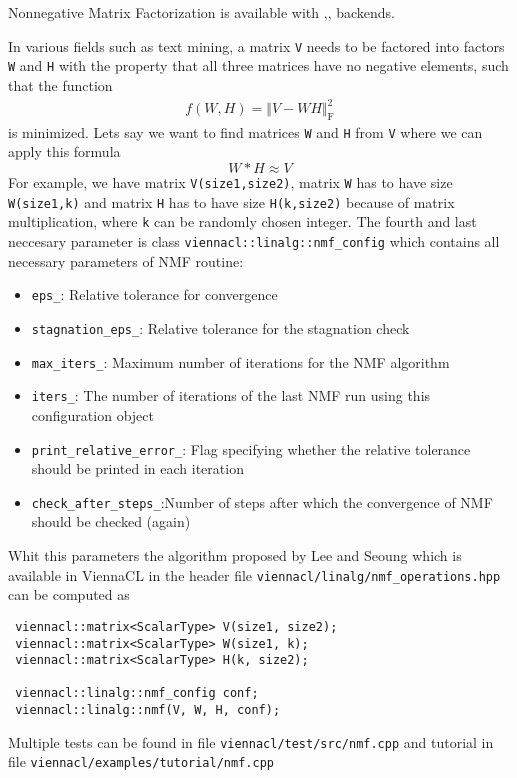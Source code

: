 Nonnegative Matrix Factorization is available with {\OpenCL},{\CUDA},{\OpenMP} backends.

In various fields such as text mining, a matrix \lstinline|V| needs to be factored into factors \lstinline|W| and \lstinline|H|  with the property that all three matrices have no negative elements, 
such that the function
\begin{align*}
 f(W, H) = \Vert V - WH \Vert_{\mathrm{F}}^2
\end{align*}
is minimized. Lets say we want to find matrices \lstinline|W| and \lstinline|H| from \lstinline|V| where we can apply this formula $$ W*H \approx V$$ For example, we have matrix 
\lstinline|V(size1,size2)|, matrix \lstinline|W| has to have size \lstinline|W(size1,k)| and matrix \lstinline|H| has to have size 
\lstinline|H(k,size2)| because of matrix multiplication, where \lstinline|k| can be randomly chosen integer.
The fourth and last neccesary parameter is class \lstinline|viennacl::linalg::nmf_config| which contains all necessary parameters 
of NMF routine: 
\begin{itemize}
 \item \lstinline|eps_|: Relative tolerance for convergence
 \item \lstinline|stagnation_eps_|: Relative tolerance for the stagnation check
 \item \lstinline|max_iters_|: Maximum number of iterations for the NMF algorithm
 \item \lstinline|iters_|: The number of iterations of the last NMF run using this configuration object
 \item \lstinline|print_relative_error_|: Flag specifying whether the relative tolerance should be printed in each iteration
 \item \lstinline|check_after_steps_|:Number of steps after which the convergence of NMF should be checked (again)
\end{itemize}
Whit this parameters the algorithm proposed by Lee and Seoung \cite{lee:nmf} which is available in ViennaCL in the header 
file \texttt{viennacl/linalg/nmf\_operations.hpp} can be computed as
\begin{lstlisting}
 viennacl::matrix<ScalarType> V(size1, size2);
 viennacl::matrix<ScalarType> W(size1, k);
 viennacl::matrix<ScalarType> H(k, size2);

 viennacl::linalg::nmf_config conf;
 viennacl::linalg::nmf(V, W, H, conf);
\end{lstlisting}
Multiple tests can be found in file \texttt{viennacl/test/src/nmf.cpp} and tutorial in file \texttt{viennacl/examples/tutorial/nmf.cpp}
